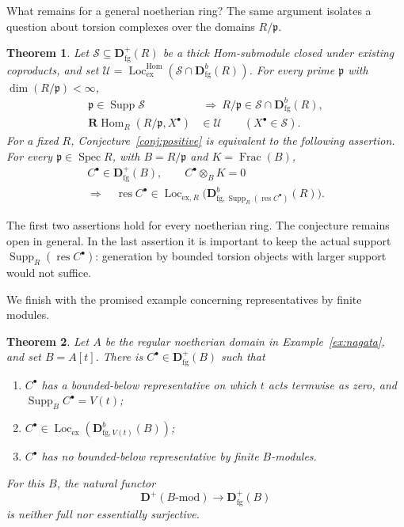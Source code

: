 \documentclass[11pt]{amsart}
\numberwithin{equation}{section}
\newtheorem{maintheorem}{Theorem}
\theoremstyle{definition}
\theoremstyle{remark}
\DeclareMathOperator{\Supp}{Supp}
\DeclareMathOperator{\Spec}{Spec}
\DeclareMathOperator{\Loc}{Loc}
\DeclareMathOperator{\Hom}{Hom}
\DeclareMathOperator{\Frac}{Frac}
\DeclareMathOperator{\res}{res}
\newcommand{\RHom}{\mathbf R\!\Hom}
\newcommand{\D}{\mathbf D}
\newcommand{\fg}{\mathrm{fg}}
\newcommand{\Lex}{\Loc_{\mathrm{ex}}}
\newcommand{\Lhom}{\Loc_{\mathrm{ex}}^{\Hom}}
\newcommand{\p}{\mathfrak p}
\begin{document}
What remains for a general noetherian ring? The same argument
isolates a question about torsion complexes over the domains
$R/\p$.

\begin{maintheorem}
\label{thm:remaining-intro}
Let $\mathcal S\subseteq\D^+_{\fg}(R)$ be a thick Hom-submodule closed
under existing coproducts, and set
$\mathcal U=\Lhom(\mathcal S\cap\D^b_{\fg}(R))$. For every prime $\p$
with $\dim(R/\p)<\infty$,
\[
 \begin{aligned}
 \p\in\Supp\mathcal S&\ \Longrightarrow\ R/\p\in\mathcal S\cap\D^b_{\fg}(R),\\
 \RHom_R(R/\p,X^{\bullet})&\in\mathcal U\qquad(X^{\bullet}\in\mathcal S).
 \end{aligned}
\]
For a fixed $R$, Conjecture~\ref{conj:positive} is equivalent
to the following assertion. For every $\p\in\Spec R$, with $B=R/\p$
and $K=\Frac(B)$,
\[
 \begin{gathered}
 C^{\bullet}\in\D^+_{\fg}(B),\qquad C^{\bullet}\otimes_BK=0\\
 \Longrightarrow\quad
 \res C^{\bullet}\in\Loc_{\mathrm{ex},R}
 \bigl(\D^b_{\fg,\Supp_R(\res C^{\bullet})}(R)\bigr).
 \end{gathered}
\]
\end{maintheorem}

The first two assertions hold for every noetherian ring. The
conjecture remains open in general. In the last assertion it is
important to keep the actual support
$\Supp_R(\res C^{\bullet})$: generation by bounded torsion objects
with larger support would not suffice.

We finish with the promised example concerning representatives
by finite modules.

\begin{maintheorem}
\label{thm:representability-intro}
Let $A$ be the regular noetherian domain in Example~\ref{ex:nagata},
and set $B=A[t]$. There is $C^{\bullet}\in\D^+_{\fg}(B)$ such that
\begin{enumerate}[label=(\roman*),leftmargin=*]
\item $C^{\bullet}$ has a bounded-below representative on which $t$ acts termwise
as zero, and $\Supp_B C^{\bullet}=V(t)$;
\item $C^{\bullet}\in\Lex(\D^b_{\fg,V(t)}(B))$;
\item $C^{\bullet}$ has no bounded-below representative by finite $B$-modules.
\end{enumerate}
For this $B$, the natural functor
\[
 \D^+(B\text{-}\mathrm{mod})\longrightarrow\D^+_{\fg}(B)
\]
is neither full nor essentially surjective.
\end{maintheorem}
\end{document}

